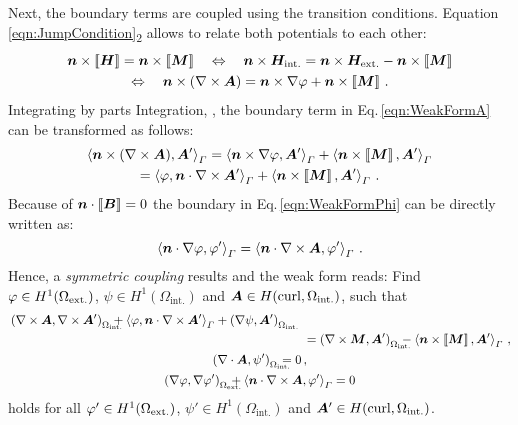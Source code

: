 Next, the boundary terms are coupled using the transition conditions. Equation\,\eqref{eqn:JumpCondition}\textsubscript{2} allows to relate both potentials to each other:
\begin{multline}
	\bm{n}\times\jump{\bm{H}}=\bm{n}\times\jump{\bm{M}}\quad \Leftrightarrow \quad \bm{n}\times\bm{H}_\mathrm{int.}=\bm{n}\times\bm{H}_\mathrm{ext.}-\bm{n}\times\jump{\bm{M}}\\
	\Leftrightarrow \quad \bm{n}\times(\nabla\times\bm{A})=\bm{n}\times\nabla\vp+\bm{n}\times\jump{\bm{M}}\,.
\end{multline}
Integrating by parts Integration, \cite[58\psq]{Monk2003}, the boundary term in Eq.\,\eqref{eqn:WeakFormA} can be transformed as follows:
\begin{multline}
	\left\langle\bm{n}\times(\nabla\times\bm{A}),\bm{A}'\right\rangle_{\varGamma}
	=\left\langle\bm{n}\times\nabla\varphi,\bm{A}'\right\rangle_{\varGamma}+\left\langle\bm{n}\times\left[\!\left[\bm{M}\right]\!\right],\bm{A}'\right\rangle_{\varGamma}\\
	=\left\langle\varphi,\bm{n}\cdot\nabla\times\bm{A}'\right\rangle_{\varGamma}+\left\langle\bm{n}\times\left[\!\left[\bm{M}\right]\!\right],\bm{A}'\right\rangle_{\varGamma}\,.
\end{multline}
Because of $\bm{n}\cdot\left[\!\left[\bm{B}\right]\!\right]=0$ the boundary in Eq.\,\eqref{eqn:WeakFormPhi} can be directly written as:
\begin{equation}
	\label{eqn:RandPhi}
	\left\langle\bm{n}\cdot\nabla\varphi,\varphi'\right\rangle_{\varGamma}=\left\langle\bm{n}\cdot\nabla\times\bm{A},\varphi'\right\rangle_{\varGamma}\,.
\end{equation}
Hence, a \emph{symmetric coupling} results and the weak form reads: 
Find $\varphi\in H^1(\Omega_\mathrm{ext.})$, $\psi\in H^1(\Omega_\mathrm{int.})$ and $\bm{A}\in H(\operatorname{curl}, \Omega_\mathrm{int.})$, such that
\begin{subequations}
\label{eqn:WeakFormFinal}
\begin{gather}
	\begin{multlined}[b]
	\left(\nabla\times\bm{A},\nabla\times\bm{A}'\right)_{\mathrlap{\Omega_\mathrm{int.}}\ \ }+\left\langle\vp,\bm{n}\cdot\nabla\times\bm{A}'\right\rangle_{\varGamma}
	+\left(\nabla\psi,\bm{A}'\right)_{\mathrlap{\Omega_\mathrm{int.}}\ \ }\\
	\hspace{8cm}=\left(\nabla\times\bm{M},\bm{A}'\right)_{\mathrlap{\Omega_\mathrm{int.}}\ \ }-\left\langle\bm{n}\times\jump{\bm{M}},\bm{A}'\right\rangle_{\varGamma}\,,
	\end{multlined}\\
	\left(\nabla\cdot\bm{A},\psi'\right)_{\mathrlap{\Omega_\mathrm{int.}}\ \ }=0\,,\\
	\left(\nabla\vp,\nabla\vp'\right)_{\mathrlap{\Omega_\mathrm{ext.}}\ \ }+\left\langle\bm{n}\cdot\nabla\times\bm{A},\vp'\right\rangle_{\varGamma}=0
\end{gather}
\end{subequations}
holds for all $\varphi'\in H^1(\Omega_\mathrm{ext.})$, $\psi'\in H^1(\Omega_\mathrm{int.})$ and $\bm{A}'\in H(\operatorname{curl}, \Omega_\mathrm{int.})$.
